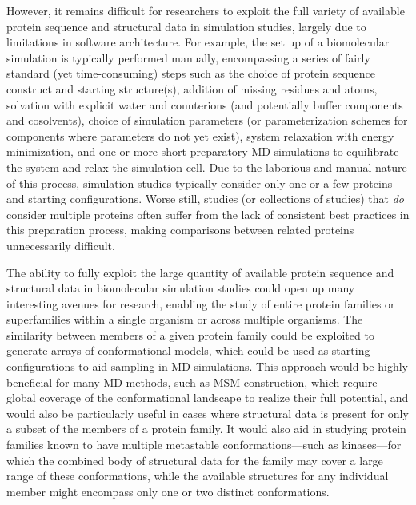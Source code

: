 \documentclass[aps,pre,twocolumn,nofootinbib,superscriptaddress,linenumbers]{revtex4-1}
\begin{document}
However, it remains difficult for researchers to exploit the full variety of available protein sequence and structural data in simulation studies, largely due to limitations in software architecture.
For example, the set up of a biomolecular simulation is typically performed manually, encompassing a series of fairly standard (yet time-consuming) steps such as the choice of protein sequence construct and starting structure(s), addition of missing residues and atoms, solvation with explicit water and counterions (and potentially buffer components and cosolvents), choice of simulation parameters (or parameterization schemes for components where parameters do not yet exist),  system relaxation with energy minimization, and one or more short preparatory MD simulations to equilibrate the system and relax the simulation cell.
Due to the laborious and manual nature of this process, simulation studies typically consider only one or a few proteins and starting configurations.
Worse still, studies (or collections of studies) that \emph{do} consider multiple proteins often suffer from the lack of consistent best practices in this preparation process, making comparisons between related proteins unnecessarily difficult.

The ability to fully exploit the large quantity of available protein sequence and structural data in biomolecular simulation studies could open up many interesting avenues for research, enabling the study of entire protein families or superfamilies within a single organism or across multiple organisms.
The similarity between members of a given protein family could be exploited to generate arrays of conformational models, which could be used as starting configurations to aid sampling in MD simulations.
This approach would be highly beneficial for many MD methods, such as MSM construction, which require global coverage of the conformational landscape to realize their full potential, and would also be particularly useful in cases where structural data is present for only a subset of the members of a protein family.
It would also aid in studying protein families known to have multiple metastable conformations---such as kinases---for which the combined body of structural data for the family may cover a large range of these conformations, while the available structures for any individual member might encompass only one or two distinct conformations.
\end{document}
